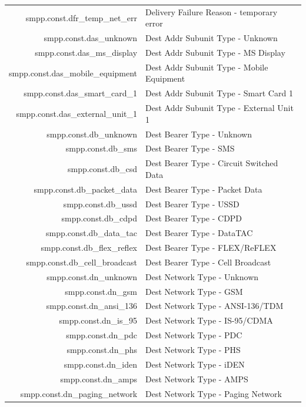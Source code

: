 \documentclass[a4paper,latin]{paper}
\begin{document}
\noindent
\begin{tabularx}{\linewidth}{ | >{\ttfamily} r | >{\ttfamily} X |}
	\hline
	smpp.const.dfr\_temp\_net\_err			& Delivery Failure Reason - temporary error\\
	smpp.const.das\_unknown				& Dest Addr Subunit Type - Unknown\\
	smpp.const.das\_ms\_display			& Dest Addr Subunit Type - MS Display\\
	smpp.const.das\_mobile\_equipment		& Dest Addr Subunit Type - Mobile Equipment\\
	smpp.const.das\_smart\_card\_1			& Dest Addr Subunit Type - Smart Card 1\\
	smpp.const.das\_external\_unit\_1		& Dest Addr Subunit Type - External Unit 1\\
	smpp.const.db\_unknown				& Dest Bearer Type - Unknown\\
	smpp.const.db\_sms				& Dest Bearer Type - SMS\\
	smpp.const.db\_csd				& Dest Bearer Type - Circuit Switched Data\\	
	smpp.const.db\_packet\_data			& Dest Bearer Type - Packet Data\\
	smpp.const.db\_ussd				& Dest Bearer Type - USSD\\
	smpp.const.db\_cdpd				& Dest Bearer Type - CDPD\\
	smpp.const.db\_data\_tac			& Dest Bearer Type - DataTAC\\
	smpp.const.db\_flex\_reflex			& Dest Bearer Type - FLEX/ReFLEX\\
	smpp.const.db\_cell\_broadcast			& Dest Bearer Type - Cell Broadcast\\
	smpp.const.dn\_unknown				& Dest Network Type - Unknown\\
	smpp.const.dn\_gsm				& Dest Network Type - GSM\\
	smpp.const.dn\_ansi\_136			& Dest Network Type - ANSI-136/TDM\\
	smpp.const.dn\_is\_95				& Dest Network Type - IS-95/CDMA\\
	smpp.const.dn\_pdc				& Dest Network Type - PDC\\
	smpp.const.dn\_phs				& Dest Network Type - PHS\\
	smpp.const.dn\_iden				& Dest Network Type - iDEN\\
	smpp.const.dn\_amps				& Dest Network Type - AMPS\\
	smpp.const.dn\_paging\_network			& Dest Network Type - Paging Network\\

\end{tabularx}
\end{document}
